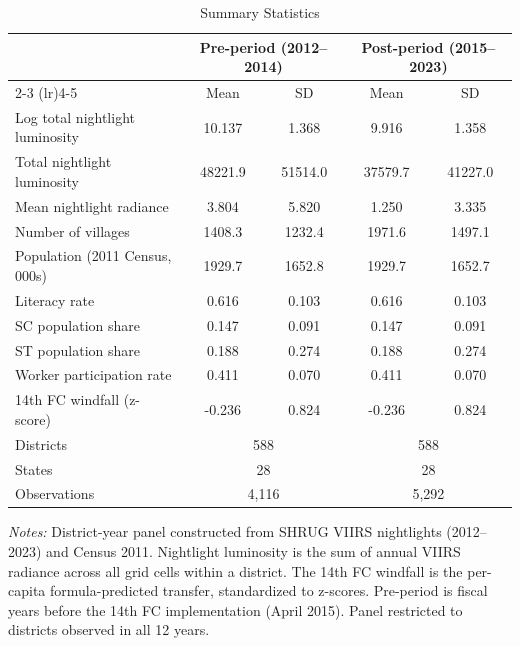 \begin{table}[htbp]
\centering
\begin{threeparttable}
\caption{Summary Statistics}
\label{tab:summary}
\begin{tabular}{lcccc}
\toprule
 & \multicolumn{2}{c}{Pre-period (2012--2014)} & \multicolumn{2}{c}{Post-period (2015--2023)} \\
\cmidrule(lr){2-3} \cmidrule(lr){4-5}
 & Mean & SD & Mean & SD \\
\midrule
Log total nightlight luminosity & 10.137 & 1.368 & 9.916 & 1.358 \\
Total nightlight luminosity & 48221.9 & 51514.0 & 37579.7 & 41227.0 \\
Mean nightlight radiance & 3.804 & 5.820 & 1.250 & 3.335 \\
Number of villages & 1408.3 & 1232.4 & 1971.6 & 1497.1 \\
Population (2011 Census, 000s) & 1929.7 & 1652.8 & 1929.7 & 1652.7 \\
\midrule
Literacy rate & 0.616 & 0.103 & 0.616 & 0.103 \\
SC population share & 0.147 & 0.091 & 0.147 & 0.091 \\
ST population share & 0.188 & 0.274 & 0.188 & 0.274 \\
Worker participation rate & 0.411 & 0.070 & 0.411 & 0.070 \\
14th FC windfall (z-score) & -0.236 & 0.824 & -0.236 & 0.824 \\
\midrule
Districts & \multicolumn{2}{c}{588} & \multicolumn{2}{c}{588} \\
States & \multicolumn{2}{c}{28} & \multicolumn{2}{c}{28} \\
Observations & \multicolumn{2}{c}{4,116} & \multicolumn{2}{c}{5,292} \\
\bottomrule
\end{tabular}
\begin{tablenotes}[flushleft]\footnotesize
\item \textit{Notes:} District-year panel constructed from SHRUG VIIRS nightlights (2012--2023) and Census 2011. Nightlight luminosity is the sum of annual VIIRS radiance across all grid cells within a district. The 14th FC windfall is the per-capita formula-predicted transfer, standardized to z-scores. Pre-period is fiscal years before the 14th FC implementation (April 2015). Panel restricted to districts observed in all 12 years.
\end{tablenotes}
\end{threeparttable}
\end{table}
